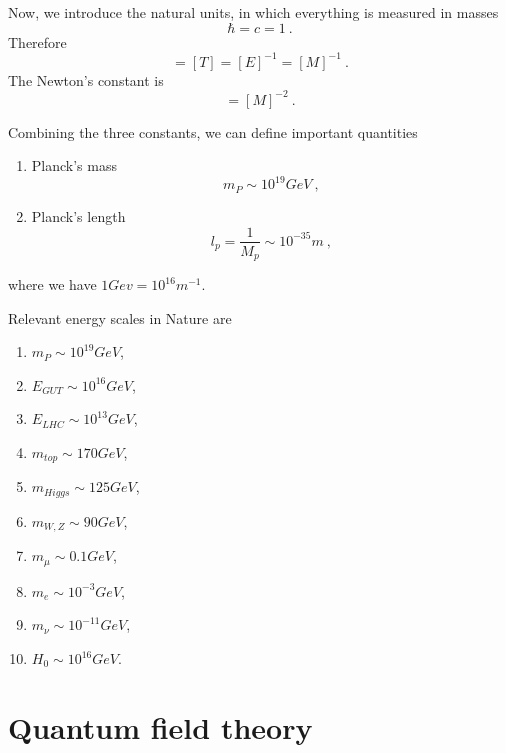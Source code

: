     Now, we introduce the natural units, in which everything is measured in masses
    \begin{equation*}
        \hbar = c = 1~.
    \end{equation*}
    Therefore 
    \begin{equation*}
        [L] = [T] = [E]^{-1} = [M]^{-1} ~.
    \end{equation*}
    The Newton's constant is 
    \begin{equation*}
        [G] = [M]^{-2} ~.
    \end{equation*}

    Combining the three constants, we can define important quantities
    \begin{enumerate}
        \item Planck's mass \begin{equation*}
            m_P \sim 10^{19} GeV ~,
        \end{equation*}
        \item Planck's length \begin{equation*}
            l_p = \frac{1}{M_p} \sim 10^{-35} m ~,
        \end{equation*}
    \end{enumerate}
    where we have $1 Gev = 10^{16} m^{-1}$.

    Relevant energy scales in Nature are 
    \begin{enumerate}
        \item $m_P \sim 10^{19} GeV$, 
        \item $E_{GUT} \sim 10^{16} GeV$, 
        \item $E_{LHC}\sim 10^{13} GeV$, 
        \item $m_{top} \sim 170 GeV$, 
        \item $m_{Higgs} \sim 125 GeV$, 
        \item $m_{W, Z} \sim 90 GeV$, 
        \item $m_{\mu} \sim 0.1 GeV$, 
        \item $m_{e} \sim 10^{-3} GeV$, 
        \item $m_{\nu} \sim 10^{-11} GeV$, 
        \item $H_0 \sim 10^{16} GeV$.
    \end{enumerate}

\chapter{Quantum field theory}


